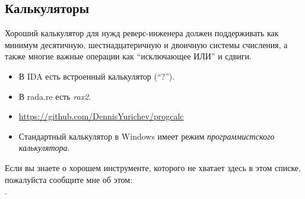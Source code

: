 \subsection{Калькуляторы}

Хороший калькулятор для нужд реверс-инженера должен поддерживать как минимум десятичную, шестнадцатеричную и двоичную системы
счисления, а также многие важные операции как ``исключающее ИЛИ'' и сдвиги.

\begin{itemize}

\item В IDA есть встроенный калькулятор (``?'').

\item В rada.re есть \emph{rax2}.

\item \url{https://github.com/DennisYurichev/progcalc}

\item Стандартный калькулятор в Windows имеет режим \emph{программистского калькулятора}.

\end{itemize}


Если вы знаете о хорошем инструменте, которого не хватает здесь в этом списке, пожалуйста сообщите мне об этом:\\
\TT{\EMAIL}.


